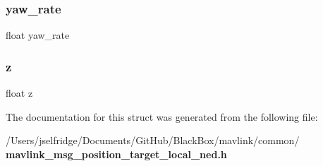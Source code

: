 \subsubsection{yaw\+\_\+rate}
{\footnotesize\ttfamily float yaw\+\_\+rate}

\mbox{\label{struct____mavlink__position__target__local__ned__t_af73583b1e980b0aa03f9884812e9fd4d}} 
\subsubsection{z}
{\footnotesize\ttfamily float z}



The documentation for this struct was generated from the following file\+:\begin{DoxyCompactItemize}
\item 
/\+Users/jselfridge/\+Documents/\+Git\+Hub/\+Black\+Box/mavlink/common/\textbf{ mavlink\+\_\+msg\+\_\+position\+\_\+target\+\_\+local\+\_\+ned.\+h}\end{DoxyCompactItemize}

